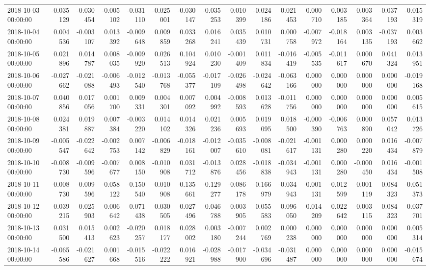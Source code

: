 \begin{tabular}{lrrrrrrrrrrrrrrr}
2018-10-03 00:00:00 & -0.035129 & -0.030454 & -0.005102 & -0.031110 & -0.025001 & -0.030147 & -0.035253 & 0.010399 & -0.024186 & 0.021453 & 0.000710 & 0.003185 & 0.003364 & -0.037193 & -0.015319 \\
2018-10-04 00:00:00 & 0.004536 & -0.003107 & 0.013392 & -0.009648 & 0.009859 & 0.033268 & 0.016241 & 0.035439 & 0.010731 & 0.000758 & -0.007972 & -0.018164 & 0.003135 & -0.037193 & 0.003662 \\
2018-10-05 00:00:00 & 0.021896 & 0.014787 & 0.008035 & -0.009920 & 0.026513 & 0.104924 & 0.010230 & -0.001409 & 0.011834 & -0.016419 & -0.005535 & -0.011617 & 0.000670 & 0.041324 & 0.013951 \\
2018-10-06 00:00:00 & -0.027662 & -0.021088 & -0.006493 & -0.012540 & -0.013768 & -0.055377 & -0.017109 & -0.026498 & -0.024642 & -0.063166 & 0.000000 & 0.000000 & 0.000000 & 0.000000 & -0.019168 \\
2018-10-07 00:00:00 & 0.040856 & 0.017056 & 0.001700 & 0.009331 & 0.004301 & 0.007092 & 0.004992 & -0.008593 & 0.013628 & -0.011756 & 0.000000 & 0.000000 & 0.000000 & 0.000000 & 0.005615 \\
2018-10-08 00:00:00 & 0.024381 & 0.019887 & 0.007384 & -0.003220 & 0.014102 & 0.014326 & 0.021236 & 0.005693 & 0.019095 & 0.018500 & -0.000390 & -0.006763 & 0.000890 & 0.057042 & 0.013726 \\
2018-10-09 00:00:00 & -0.005547 & -0.022642 & -0.002753 & 0.007142 & -0.006829 & -0.018161 & -0.012007 & -0.035610 & -0.008081 & -0.021617 & -0.001131 & 0.000280 & 0.000220 & 0.016434 & -0.007879 \\
2018-10-10 00:00:00 & -0.008730 & -0.009596 & -0.007677 & 0.008150 & -0.010908 & 0.031712 & -0.013876 & 0.028456 & -0.018838 & -0.034943 & -0.001131 & 0.000280 & -0.000450 & 0.016434 & -0.001508 \\
2018-10-11 00:00:00 & -0.008730 & -0.009596 & -0.058122 & -0.150540 & -0.010908 & -0.135661 & -0.129277 & -0.086178 & -0.166979 & -0.034943 & -0.001131 & -0.012599 & 0.001119 & 0.084323 & -0.051373 \\
2018-10-12 00:00:00 & 0.039215 & 0.025903 & 0.006642 & 0.071438 & 0.030505 & 0.027496 & 0.046788 & 0.003905 & 0.055583 & 0.096050 & 0.014209 & 0.022642 & 0.003115 & 0.084323 & 0.037701 \\
2018-10-13 00:00:00 & 0.031500 & 0.015413 & 0.002623 & -0.020257 & 0.018177 & 0.028002 & 0.003180 & -0.007244 & 0.002769 & 0.000238 & 0.000000 & 0.000000 & 0.000000 & 0.000000 & 0.005314 \\
2018-10-14 00:00:00 & -0.065586 & -0.021627 & 0.001668 & -0.015516 & -0.022222 & 0.016921 & -0.028988 & -0.017900 & -0.034696 & -0.031487 & 0.000000 & 0.000000 & 0.000000 & 0.000000 & -0.015674 \\

\end{tabular}
